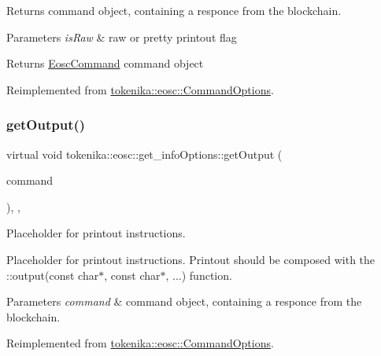 Returns command object, containing a responce from the blockchain. 


\begin{DoxyParams}{Parameters}
{\em is\+Raw} & raw or pretty printout flag \\
\hline
\end{DoxyParams}
\begin{DoxyReturn}{Returns}
\hyperlink{classtokenika_1_1eosc_1_1_eosc_command}{Eosc\+Command} command object 
\end{DoxyReturn}


Reimplemented from \hyperlink{classtokenika_1_1eosc_1_1_command_options_a787f15164e2055394d9d948c07bf201c}{tokenika\+::eosc\+::\+Command\+Options}.

\mbox{\label{classtokenika_1_1eosc_1_1get__info_options_aedbefe0b0c3a7efca9429066588492db}} 
\subsubsection{\texorpdfstring{get\+Output()}{getOutput()}}
{\footnotesize\ttfamily virtual void tokenika\+::eosc\+::get\+\_\+info\+Options\+::get\+Output (\begin{DoxyParamCaption}\item[{\hyperlink{classtokenika_1_1eosc_1_1_eosc_command}{tokenika\+::eosc\+::\+Eosc\+Command}}]{command }\end{DoxyParamCaption})\hspace{0.3cm}{\ttfamily [inline]}, {\ttfamily [protected]}, {\ttfamily [virtual]}}



Placeholder for printout instructions. 

Placeholder for printout instructions. Printout should be composed with the \+::output(const char$\ast$, const char$\ast$, ...) function.


\begin{DoxyParams}{Parameters}
{\em command} & command object, containing a responce from the blockchain. \\
\hline
\end{DoxyParams}


Reimplemented from \hyperlink{classtokenika_1_1eosc_1_1_command_options_a346dcfb00b8ac522169714544bfa7be0}{tokenika\+::eosc\+::\+Command\+Options}.

